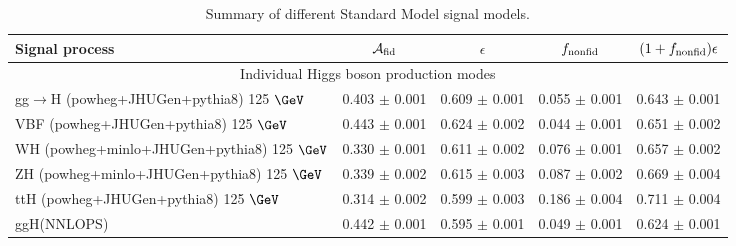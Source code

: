 \documentclass{article}
\begin{document}
\begin{table}[!h!tb]
\begin{center}
\small
\caption{
Summary of different Standard Model signal models.
\label{tab:summarySM}
}
\begin{tabular}{|l|c|c|c|c|} \hline \hline 
\textbf{Signal process} & $\mathcal{A}_{\rm fid}$ & $\epsilon$ & $f_{\rm nonfid}$  & $(1+f_{\rm nonfid})\epsilon$ \\ \hline \hline 
\multicolumn{5}{|c|}{Individual Higgs boson production modes} \\ \hline 
gg$\rightarrow$H ({\sc powheg+JHUGen+pythia8}) 125 $\GeV$ & 0.403 $\pm$ 0.001 & 0.609 $\pm$ 0.001 & 0.055 $\pm$ 0.001 & 0.643 $\pm$ 0.001 \\ 
 VBF ({\sc powheg+JHUGen+pythia8}) 125 $\GeV$ & 0.443 $\pm$ 0.001 & 0.624 $\pm$ 0.002 & 0.044 $\pm$ 0.001 & 0.651 $\pm$ 0.002 \\ 
 WH ({\sc powheg+minlo+JHUGen+pythia8}) 125 $\GeV$ & 0.330 $\pm$ 0.001 & 0.611 $\pm$ 0.002 & 0.076 $\pm$ 0.001 & 0.657 $\pm$ 0.002 \\ 
 ZH ({\sc powheg+minlo+JHUGen+pythia8}) 125 $\GeV$ & 0.339 $\pm$ 0.002 & 0.615 $\pm$ 0.003 & 0.087 $\pm$ 0.002 & 0.669 $\pm$ 0.004 \\ 
 ttH ({\sc powheg+JHUGen+pythia8}) 125 $\GeV$ & 0.314 $\pm$ 0.002 & 0.599 $\pm$ 0.003 & 0.186 $\pm$ 0.004 & 0.711 $\pm$ 0.004 \\ 
 ggH(NNLOPS) & 0.442 $\pm$ 0.001 & 0.595 $\pm$ 0.001 & 0.049 $\pm$ 0.001 & 0.624 $\pm$ 0.001 \\ 
 
\hline \hline
\end{tabular}
\normalsize
\end{center}
\end{table}
 
 
 
\end{document}

